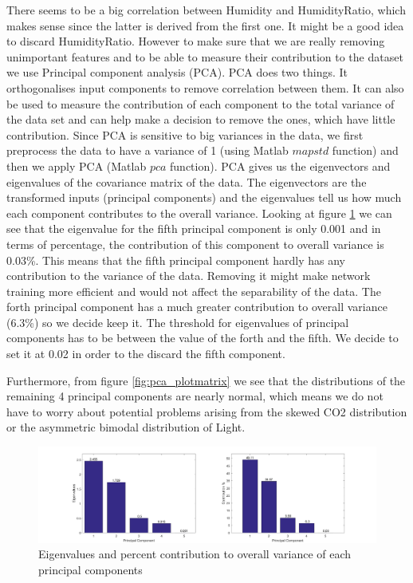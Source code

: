 \documentclass[a4paper, 11pt]{article}
\begin{document}
There seems to be a big correlation between Humidity and HumidityRatio, which makes sense since the latter is derived from the first one. It might be a good idea to discard HumidityRatio. However to make sure that we are really removing unimportant features and to be able to measure their contribution to the dataset we use Principal component analysis (PCA). PCA does two things. It orthogonalises input components to remove correlation between them. It can also be used to measure the contribution of each component to the total variance of the data set and can help make a decision to remove the ones, which have little contribution. Since PCA is sensitive to big variances in the data, we first preprocess the data to have a variance of 1 (using Matlab $mapstd$ function) and then we apply PCA (Matlab $pca$ function). PCA gives us the eigenvectors and eigenvalues of the covariance matrix of the data. The eigenvectors are the transformed inputs (principal components) and the eigenvalues tell us how much each component contributes to the overall variance. Looking at figure \ref{fig:eigenvalues} we can see that the eigenvalue for the fifth principal component is only 0.001 and in terms of percentage, the contribution of this component to overall variance is 0.03\%. This means that the fifth principal component hardly has any contribution to the variance of the data. Removing it might make network training more efficient and would not affect the separability of the data. The forth principal component has a much greater contribution to overall variance (6.3\%) so we decide keep it. The threshold for eigenvalues of principal components has to be between the value of the forth and the fifth. We decide to set it at 0.02 in order to the discard the fifth component.

Furthermore, from figure \ref{fig:pca_plotmatrix} we see that the distributions of the remaining 4 principal components are nearly normal, which means we do not have to worry about potential problems arising from the skewed CO2 distribution or the asymmetric bimodal distribution of Light.

\begin{figure}[h]
  	\centering
    \includegraphics[width=1\textwidth]{../figures/eigenvalues.png}
    \caption{Eigenvalues and percent contribution to overall variance of each principal components}
    \label{fig:eigenvalues}
\end{figure}
\end{document}
